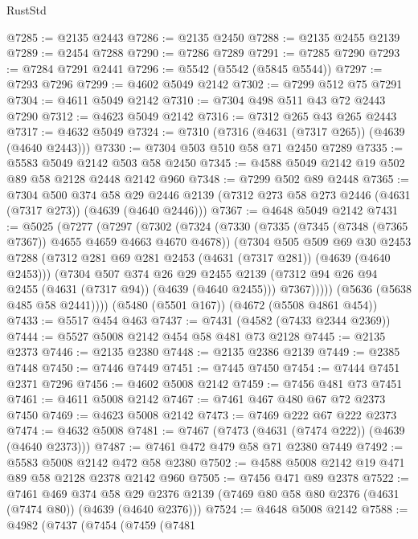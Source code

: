 \begin{lexlean}{RustStd}
\begin{coremodule}
@7285 := @2135 @2443
@7286 := @2135 @2450
@7288 := @2135 @2455 @2139
@7289 := @2454 @7288
@7290 := @7286 @7289
@7291 := @7285 @7290
@7293 := @7284 @7291 @2441
@7296 := @5542 (@5542 (@5845 @5544))
@7297 := @7293 @7296
@7299 := @4602 @5049 @2142
@7302 := @7299 @512 @75 @7291
@7304 := @4611 @5049 @2142
@7310 := @7304 @498 @511 @43 @72 @2443 @7290
@7312 := @4623 @5049 @2142
@7316 := @7312 @265 @43 @265 @2443
@7317 := @4632 @5049
@7324 := @7310 (@7316 (@4631 (@7317 @265)) (@4639 (@4640 @2443)))
@7330 := @7304 @503 @510 @58 @71 @2450 @7289
@7335 := @5583 @5049 @2142 @503 @58 @2450
@7345 := @4588 @5049 @2142 @19 @502 @89 @58 @2128 @2448 @2142 @960
@7348 := @7299 @502 @89 @2448
@7365 := @7304
    @500
    @374
    @58
    @29
    @2446
    @2139
    (@7312 @273 @58 @273 @2446 (@4631 (@7317 @273)) (@4639 (@4640 @2446)))
@7367 := @4648 @5049 @2142
@7431 := @5025
    (@7277
      (@7297
        (@7302
          (@7324
            (@7330
              (@7335 (@7345 (@7348 (@7365 @7367)) @4655 @4659 @4663 @4670 @4678))
              (@7304
                @505
                @509
                @69
                @30
                @2453
                @7288
                (@7312 @281 @69 @281 @2453 (@4631 (@7317 @281)) (@4639 (@4640 @2453)))
                (@7304
                  @507
                  @374
                  @26
                  @29
                  @2455
                  @2139
                  (@7312 @94 @26 @94 @2455 (@4631 (@7317 @94)) (@4639 (@4640 @2455)))
                  @7367)))))
        (@5636 (@5638 @485 @58 @2441))))
    (@5480 (@5501 @167))
    (@4672 (@5508 @4861 @454))
@7433 := @5517 @454 @463
@7437 := @7431 (@4582 (@7433 @2344 @2369))
@7444 := @5527 @5008 @2142 @454 @58 @481 @73 @2128
@7445 := @2135 @2373
@7446 := @2135 @2380
@7448 := @2135 @2386 @2139
@7449 := @2385 @7448
@7450 := @7446 @7449
@7451 := @7445 @7450
@7454 := @7444 @7451 @2371 @7296
@7456 := @4602 @5008 @2142
@7459 := @7456 @481 @73 @7451
@7461 := @4611 @5008 @2142
@7467 := @7461 @467 @480 @67 @72 @2373 @7450
@7469 := @4623 @5008 @2142
@7473 := @7469 @222 @67 @222 @2373
@7474 := @4632 @5008
@7481 := @7467 (@7473 (@4631 (@7474 @222)) (@4639 (@4640 @2373)))
@7487 := @7461 @472 @479 @58 @71 @2380 @7449
@7492 := @5583 @5008 @2142 @472 @58 @2380
@7502 := @4588 @5008 @2142 @19 @471 @89 @58 @2128 @2378 @2142 @960
@7505 := @7456 @471 @89 @2378
@7522 := @7461
    @469
    @374
    @58
    @29
    @2376
    @2139
    (@7469 @80 @58 @80 @2376 (@4631 (@7474 @80)) (@4639 (@4640 @2376)))
@7524 := @4648 @5008 @2142
@7588 := @4982
    (@7437
      (@7454
        (@7459
          (@7481

\end{coremodule}
\end{lexlean}
